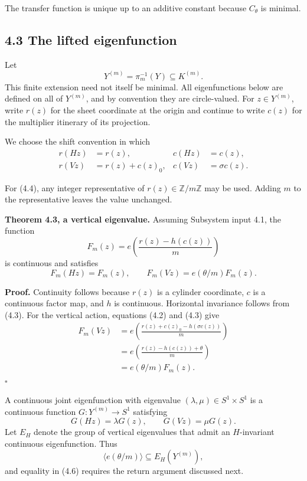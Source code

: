 \documentclass[11pt]{article}
\begin{document}
The transfer function is unique up to an additive constant because
\(C_\theta\) is minimal.

\subsection*{4.3 The lifted eigenfunction}

Let
\[
  Y^{(m)}=\pi_m^{-1}(Y)\subseteq K^{(m)}.
\]
This finite extension need not itself be minimal. All eigenfunctions below
are defined on all of \(Y^{(m)}\), and by convention they are circle-valued.
For \(z\in Y^{(m)}\), write \(r(z)\) for the sheet coordinate at the origin
and continue to write \(c(z)\) for the multiplier itinerary of its
projection.

We choose the shift convention in which
\[
\begin{aligned}
 r(Hz)&=r(z),&
 c(Hz)&=c(z),\\
 r(Vz)&=r(z)+c(z)_0,&
 c(Vz)&=\sigma c(z).
\end{aligned}
\tag{4.3}
\]

For (4.4), any integer representative of
\(r(z)\in\mathbb Z/m\mathbb Z\) may be used. Adding \(m\) to the
representative leaves the value unchanged.

\textbf{Theorem 4.3, a vertical eigenvalue.} Assuming Subsystem input 4.1, the
function
\[
  F_m(z)=
  e\left(\frac{r(z)-h(c(z))}{m}\right)
  \tag{4.4}
\]
is continuous and satisfies
\[
  F_m(Hz)=F_m(z),\qquad
  F_m(Vz)=e(\theta/m)F_m(z).
  \tag{4.5}
\]

\textbf{Proof.} Continuity follows because \(r(z)\) is a cylinder coordinate,
\(c\) is a continuous factor map, and \(h\) is continuous. Horizontal
invariance follows from (4.3). For the vertical action, equations (4.2) and
(4.3) give
\[
\begin{aligned}
F_m(Vz)
 &=e\left(
   \frac{r(z)+c(z)_0-h(\sigma c(z))}{m}
   \right)\\
 &=e\left(
   \frac{r(z)-h(c(z))+\theta}{m}
   \right)\\
 &=e(\theta/m)F_m(z).
\end{aligned}
\]
\(\square\)

A continuous joint eigenfunction with eigenvalue
\((\lambda,\mu)\in S^1\times S^1\) is a continuous function
\(G:Y^{(m)}\to S^1\)
satisfying
\[
  G(Hz)=\lambda G(z),\qquad G(Vz)=\mu G(z).
\]
Let \(E_H\) denote the group of vertical eigenvalues that admit an
\(H\)-invariant continuous eigenfunction. Thus
\[
  \langle e(\theta/m)\rangle
  \subseteq E_H(Y^{(m)}),
  \tag{4.6}
\]
and equality in (4.6) requires the return argument discussed next.
\end{document}
